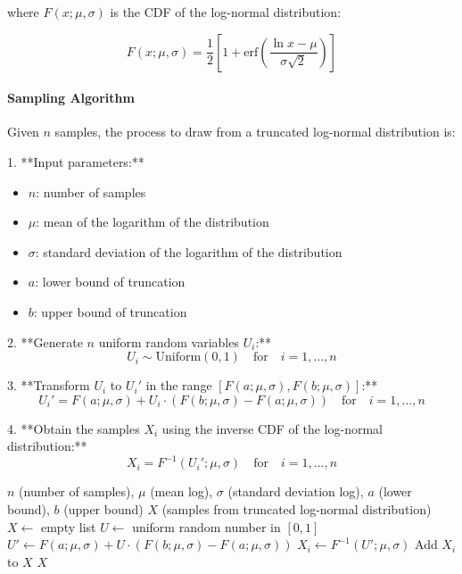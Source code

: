 \documentclass[pdflatex,sn-mathphys-num]{sn-jnl}%
\theoremstyle{thmstyleone}%
\theoremstyle{thmstyletwo}%
\theoremstyle{thmstylethree}%
\begin{document}
where \(F(x; \mu, \sigma)\) is the CDF of the log-normal distribution:

\[
F(x; \mu, \sigma) = \frac{1}{2} \left[1 + \text{erf}\left(\frac{\ln x - \mu}{\sigma \sqrt{2}}\right)\right]
\]

\paragraph{Sampling Algorithm}

Given \( n \) samples, the process to draw from a truncated log-normal distribution is:

1. **Input parameters:**
   \begin{itemize}
       \item \( n \): number of samples
       \item \( \mu \): mean of the logarithm of the distribution
       \item \( \sigma \): standard deviation of the logarithm of the distribution
       \item \( a \): lower bound of truncation
       \item \( b \): upper bound of truncation
   \end{itemize}

2. **Generate \( n \) uniform random variables \( U_i \):**
   \[
   U_i \sim \text{Uniform}(0, 1) \quad \text{for} \quad i = 1, \ldots, n
   \]

3. **Transform \( U_i \) to \( U_i' \) in the range \([F(a; \mu, \sigma), F(b; \mu, \sigma)]\):**
   \[
   U_i' = F(a; \mu, \sigma) + U_i \cdot (F(b; \mu, \sigma) - F(a; \mu, \sigma)) \quad \text{for} \quad i = 1, \ldots, n
   \]

4. **Obtain the samples \( X_i \) using the inverse CDF of the log-normal distribution:**
   \[
   X_i = F^{-1}(U_i'; \mu, \sigma) \quad \text{for} \quad i = 1, \ldots, n
   \]


\begin{algorithm}
\caption{Generate Truncated Log-Normal Samples}\label{alg:truncatedLogNormal}
\begin{algorithmic}[1]
\Require $n$ (number of samples), $\mu$ (mean log), $\sigma$ (standard deviation log), $a$ (lower bound), $b$ (upper bound)
\Ensure $X$ (samples from truncated log-normal distribution)
\State $X \gets$ empty list
    \State $U \gets$ uniform random number in $[0, 1]$
    \State $U' \gets F(a; \mu, \sigma) + U \cdot (F(b; \mu, \sigma) - F(a; \mu, \sigma))$
    \State $X_i \gets F^{-1}(U'; \mu, \sigma)$
    \State Add $X_i$ to $X$
\EndFor
\State \Return $X$
\end{algorithmic}
\end{algorithm}
\end{document}
